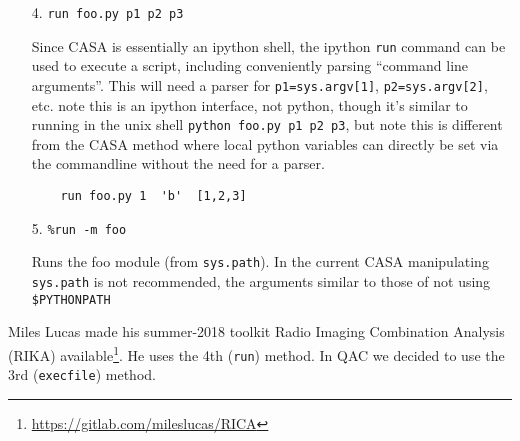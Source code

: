 \documentclass[12pt,a4paper]{article}
\begin{document}
\begin{itemize}

\footnotesize
\begin{verbatim}
    foo_bar(1,'b',[1,2,3])
\end{verbatim}
\normalsize


Incidentally, if these are combined and only one script needs to be executed and then analyzed
outside of CASA, a very efficient way it to use could be to call casa from the command line,
e.g. directly from bash (or via a Makefile):

\footnotesize
\begin{verbatim}
    % casa --nogui -c foo.py a=1 b='"b"' c='[1,2,3]' > foo.log 2&>1
\end{verbatim}
\normalsize

The overhead of setting up CASA before this script really starts work
varies a lot depending on cashing and what's in the casa init files, but can
be anywhere from 5 to 20 seconds. If many of these scripts are to be run, and each
only takes a short time, the overhead will be too large, and alternative method
will need to be employed (see below).



\item[4.]  \verb+run foo.py p1 p2 p3+

Since CASA is essentially an ipython shell, the ipython {\tt run} command can be used to execute
a script, including conveniently parsing ``command line arguments''.
This will need a parser for \verb+p1=sys.argv[1]+, \verb+p2=sys.argv[2]+, etc.
note this is an ipython interface, not python, though it's similar to
running in the unix shell \verb+python foo.py p1 p2 p3+, but note this is different
from the CASA method where local python variables can directly be set via the commandline
without the need for a parser.

\footnotesize
\begin{verbatim}
    run foo.py 1  'b'  [1,2,3]
\end{verbatim}
\normalsize

                           
\item[5.]   \verb+%run -m foo+

Runs the foo module (from {\tt sys.path}). In the current CASA manipulating
{\tt sys.path} is not recommended, the arguments similar to those of not
using \verb+$PYTHONPATH+

\end{itemize}

Miles Lucas made his summer-2018 toolkit Radio Imaging Combination Analysis (RIKA)
available\footnote{\url{https://gitlab.com/mileslucas/RICA}}. He uses the 4th ({\tt run}) method.
In QAC we decided to use the 3rd ({\tt execfile}) method.
\end{document}
